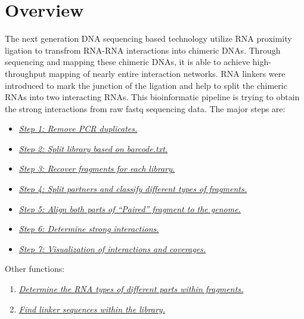 \documentclass[letterpaper,10pt,english]{sphinxmanual}
\begin{document}
\section{Overview}
\label{Analysis_pipeline:overview}
The next generation DNA sequencing based technology utilize RNA proximity ligation to transfrom RNA-RNA interactions into chimeric DNAs. Through sequencing and mapping these chimeric DNAs, it is able to achieve high-throughput mapping of nearly entire interaction networks. RNA linkers were introduced to mark the junction of the ligation and help to split the chimeric RNAs into two interacting RNAs.
This bioinformatic pipeline is trying to obtain the strong interactions from raw fastq sequencing data. The major steps are:
\begin{itemize}
\item {} 
{\hyperref[Analysis_pipeline:step1]{\emph{Step 1: Remove PCR duplicates.}}}

\item {} 
{\hyperref[Analysis_pipeline:step2]{\emph{Step 2: Split library based on barcode.txt.}}}

\item {} 
{\hyperref[Analysis_pipeline:step3]{\emph{Step 3: Recover fragments for each library.}}}

\item {} 
{\hyperref[Analysis_pipeline:step4]{\emph{Step 4: Split partners and classify different types of fragments.}}}

\item {} 
{\hyperref[Analysis_pipeline:step5]{\emph{Step 5: Align both parts of ``Paired'' fragment to the genome.}}}

\item {} 
{\hyperref[Analysis_pipeline:step6]{\emph{Step 6: Determine strong interactions.}}}

\item {} 
{\hyperref[Analysis_pipeline:step7]{\emph{Step 7: Visualization of interactions and coverages.}}}

\end{itemize}

Other functions:
\begin{enumerate}
\item {} 
{\hyperref[Analysis_pipeline:rna-types]{\emph{Determine the RNA types of different parts within fragments.}}}

\item {} 
{\hyperref[Analysis_pipeline:find-linker]{\emph{Find linker sequences within the library.}}}

\end{enumerate}
\end{document}
